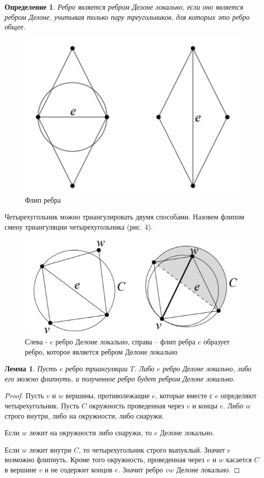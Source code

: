 \documentclass{fefu}
\newtheorem{definition}{Определение}
\newtheorem{lemma}{Лемма}
\begin{document}
\begin{definition}
    Ребро является ребром Делоне локально, если оно является ребром Делоне, учитывая только пару треугольников, для 
    которых это ребро общее.
\end{definition}
\begin{figure}[H]
    \centering
    \includegraphics{images/Flip.jpg}
    \caption{Флип ребра}
\end{figure}
Четырехугольник можно триангулировать двумя способами. Назовем флипом смену триангуляции четырехугольника (рис. 4).

\begin{figure}[H]
    \centering
    \includegraphics{images/FlipLemma.jpg}
    \caption{Слева - $e$ ребро Делоне локально, справа -- флип ребра $e$ образует ребро, которое является ребром Делоне 
    локально}
\end{figure}
\begin{lemma}
    Пусть $e$ ребро триангуляции $T$. Либо $e$ ребро Делоне локально, либо его можно флипнуть, и полученное ребро будет 
    ребром Делоне локально.
\end{lemma}
\begin{proof}
    Пусть $v$ и $w$ вершины, противолежащие $e$, которые вместе с $e$ определяют четырехугольник. Пусть $C$ окружность
    проведенная через $v$ и концы $e$. Либо $w$ строго внутри, либо на окружности, либо снаружи.

    Если $w$ лежит на окружности либо снаружи, то $e$ Делоне локально.

    Если $w$ лежит внутри $C$, то четырехугольник строго выпуклый. Значит $e$ возможно флипнуть. Кроме того окружность,
    проведенная через $v$ и $w$ касается $C$ в вершине $v$ и не содержит концов $e$. Значит ребро $vw$ Делоне локально.
\end{proof}
\end{document}

